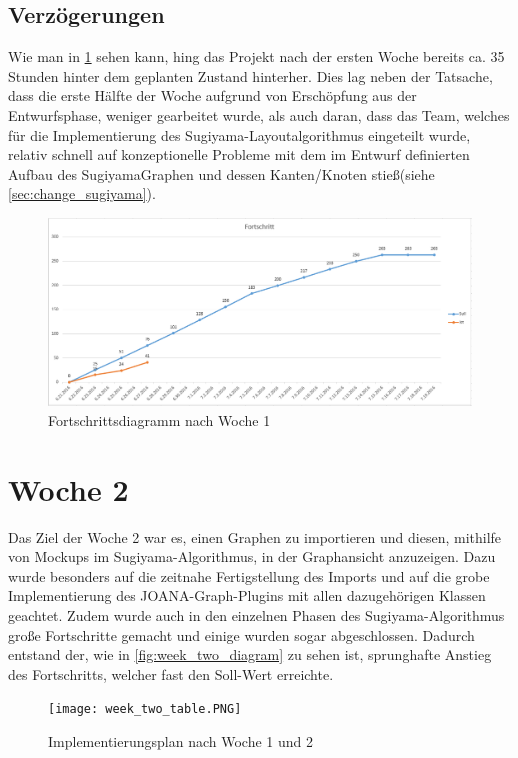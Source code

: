 \subsection{Verzögerungen}
Wie man in \ref{fig:week_one_diagram} sehen kann, hing das Projekt nach der ersten Woche bereits ca. 35 Stunden hinter dem geplanten Zustand hinterher.
Dies lag neben der Tatsache, dass die erste Hälfte der Woche aufgrund von Erschöpfung aus der Entwurfsphase, weniger gearbeitet wurde, als auch daran, dass das Team, welches für die Implementierung des Sugiyama-Layoutalgorithmus eingeteilt wurde, relativ schnell auf konzeptionelle Probleme mit dem im Entwurf definierten Aufbau des SugiyamaGraphen und dessen Kanten/Knoten stieß(siehe \ref{sec:change_sugiyama}).
\begin{figure}[!htbp]
	\centering
	\includegraphics[width=380pt]{resourcen/week_one_diagram.PNG}
	\caption{Fortschrittsdiagramm nach Woche 1}
	\label{fig:week_one_diagram}
\end{figure}

\newpage

\section{Woche 2}
Das Ziel der Woche 2 war es, einen Graphen zu importieren und diesen, mithilfe von Mockups im Sugiyama-Algorithmus, in der Graphansicht anzuzeigen.
Dazu wurde besonders auf die zeitnahe Fertigstellung des Imports und auf die grobe Implementierung des JOANA-Graph-Plugins mit allen dazugehörigen Klassen geachtet. Zudem wurde auch in den einzelnen Phasen des Sugiyama-Algorithmus große Fortschritte gemacht und einige wurden sogar abgeschlossen. Dadurch entstand der, wie in \ref{fig:week_two_diagram} zu sehen ist, sprunghafte Anstieg des Fortschritts, welcher fast den Soll-Wert erreichte. 
\begin{figure}[!htbp]
	\centering
	\texttt{[image: week\_two\_table.PNG]}
	\caption{Implementierungsplan nach Woche 1 und 2}
	\label{fig:week_two_table}
\end{figure}
